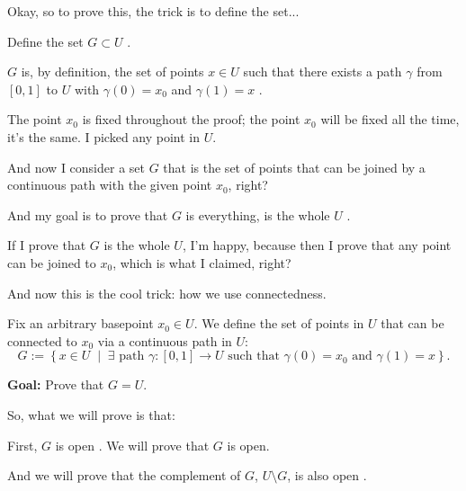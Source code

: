 \begin{proofWrapper}
\begin{speech}[01:03:02 - 01:04:40]
Okay, so to prove this, the trick is to define the set...

Define the set $G \subset U$ .

$G$ is, by definition, the set of points $x \in U$ such that there exists a path $\gamma$ from $[0, 1]$ to $U$ with $\gamma(0) = x_0$ and $\gamma(1) = x$ .

The point $x_0$ is fixed throughout the proof; the point $x_0$ will be fixed all the time, it's the same. I picked any point in $U$.

And now I consider a set $G$ that is the set of points that can be joined by a continuous path with the given point $x_0$, right?

And my goal is to prove that $G$ is everything, is the whole $U$ .

If I prove that $G$ is the whole $U$, I'm happy, because then I prove that any point can be joined to $x_0$, which is what I claimed, right?

And now this is the cool trick: how we use connectedness.
\end{speech}

\begin{content}
Fix an arbitrary basepoint $x_0 \in U$. We define the set of points in $U$ that can be connected to $x_0$ via a continuous path in $U$:
\begin{equation}\label{eq:def-component-g}
G := \left\{ x \in U \;\middle|\; \exists \text{ path } \gamma \colon [0, 1] \to U \text{ such that } \gamma(0) = x_0 \text{ and } \gamma(1) = x \right\}.
\end{equation}

\textbf{Goal:} Prove that $G = U$.
\end{content}

\begin{speech}[01:04:40 - 01:06:17]
So, what we will prove is that:

First, $G$ is open . We will prove that $G$ is open.

And we will prove that the complement of $G$, $U \setminus G$, is also open .


\end{speech}
\end{proofWrapper}
